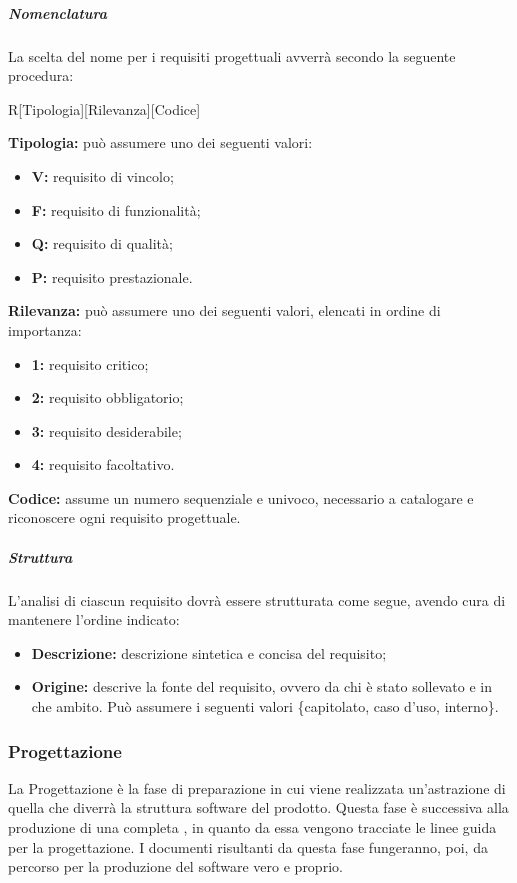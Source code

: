 			\subparagraph{Nomenclatura}
			La scelta del nome per i requisiti progettuali avverrà secondo la seguente procedura:
			\begin{center}
			R[Tipologia][Rilevanza][Codice]
			\end{center}
			\textbf{Tipologia:} può assumere uno dei seguenti valori:
			\begin{itemize}
				\item \textbf{V:} requisito di vincolo;
				\item \textbf{F:} requisito di funzionalità;
				\item \textbf{Q:} requisito di qualità;
				\item \textbf{P:} requisito prestazionale.
			\end{itemize}
			\textbf{Rilevanza:} può assumere uno dei seguenti valori, elencati in ordine di importanza:
			\begin{itemize}
				\item \textbf{1:} requisito critico;
				\item \textbf{2:} requisito obbligatorio;
				\item \textbf{3:} requisito desiderabile;
				\item \textbf{4:} requisito facoltativo.
			\end{itemize}
			\textbf{Codice:} assume un numero sequenziale e univoco, necessario a catalogare e riconoscere ogni requisito progettuale.
		
			\subparagraph{Struttura}
			L'analisi di ciascun requisito dovrà essere strutturata come segue, avendo cura di mantenere l'ordine indicato:
			\begin{itemize}
			  \item \textbf{Descrizione:} descrizione sintetica e concisa del requisito;
			  \item \textbf{Origine:} descrive la fonte del requisito, ovvero da chi è stato sollevato e in che ambito. Può assumere i seguenti valori \{capitolato, caso d'uso, interno\}.
			\end{itemize}
	
	\subsubsection{Progettazione}
	La Progettazione è la fase di preparazione in cui viene realizzata un'astrazione di quella che diverrà la struttura software del prodotto. Questa fase è successiva alla produzione di una completa \AdR, in quanto da essa vengono tracciate le linee guida per la progettazione. I documenti risultanti da questa fase fungeranno, poi, da percorso per la produzione del software vero e proprio.
	
